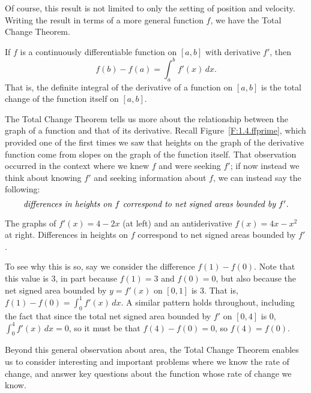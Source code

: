 Of course, this result is not limited to only the setting of position and velocity.  Writing the result in terms of a more general function $f$, we have the Total Change Theorem.

{If $f$ is a continuously differentiable function on $[a,b]$ with derivative $f'$, then
\begin{equation} \label{E:TotalChange}
f(b) - f(a) = \int_a^b f'(x) \, dx.
\end{equation}
That is, the definite integral of the derivative of a function on $[a,b]$ is the total change of the function itself on $[a,b]$.
} %

The Total Change Theorem tells us more about the relationship between the graph of a function and that of its derivative.  Recall Figure~\ref{F:1.4.ffprime}, which provided one of the first times we saw that heights on the graph of the derivative function come from slopes on the graph of the function itself.  That observation occurred in the context where we knew $f$ and were seeking $f'$; if now instead we think about knowing $f'$ and seeking information about $f$, we can instead say the following:  
\[ \mbox{\emph{differences in heights on $f$ correspond to net signed areas bounded by $f'$.}} \]
\begin{marginfigure} %
\caption{The graphs of $f'(x) = 4 - 2x$ (at left) and an antiderivative $f(x) = 4x - x^2$ at right.  Differences in heights on $f$ correspond to net signed areas bounded by $f'$.} \label{F:4.4.TCT}
\end{marginfigure}
To see why this is so, say we consider the difference $f(1) - f(0)$.  Note that this value is 3, in part because $f(1) = 3$ and $f(0) = 0$, but also because the net signed area bounded by $y = f'(x)$ on $[0,1]$ is 3.  That is, $f(1) - f(0) = \int_0^1 f'(x) \, dx$.  A similar pattern holds throughout, including the fact that since the total net signed area bounded by $f'$ on $[0,4]$ is $0$, $\int_0^4 f'(x) \, dx = 0$, so it must be that $f(4) - f(0) = 0$, so $f(4) = f(0)$.

Beyond this general observation about area, the Total Change Theorem enables us to consider interesting and important problems where we know the rate of change, and answer key questions about the function whose rate of change we know.



